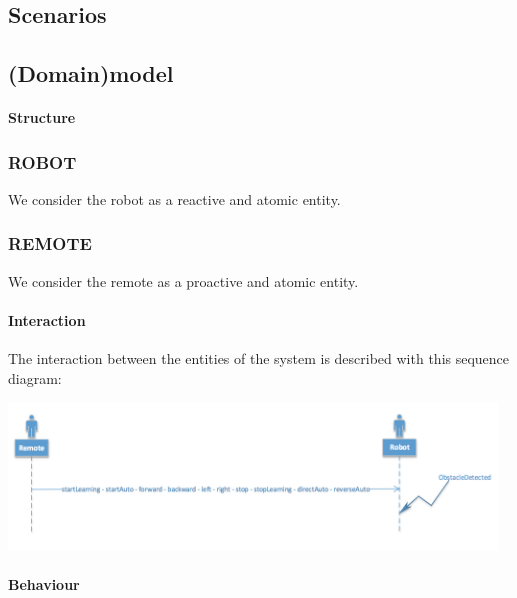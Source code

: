 \documentclass{llncs}
\newcommand{\labelssec}[1]{\label{ssec:#1}}
\begin{document}
\subsection{Scenarios}
\labelssec{Scenarios}

\subsection{(Domain)model}
\labelssec{(Domain)model}
\paragraph{Structure}
\subsubsection{ROBOT}
We consider the robot as a reactive and atomic entity.
\subsubsection{REMOTE}
We consider the remote as a proactive and atomic entity.
\paragraph{Interaction}
The interaction between the entities of the system is described with this sequence diagram:
\begin{center}
   	\includegraphics[width=13cm]{img/interactionRobot.png}\\
\end{center}
\paragraph{Behaviour}
\end{document}
